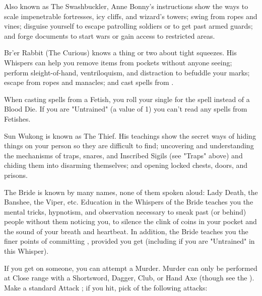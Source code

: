     Also known as The Swashbuckler, Anne Bonny's instructions show the ways to scale impenetrable fortresses, icy cliffs, and wizard's towers; swing from ropes and vines; disguise yourself to escape patrolling soldiers or to get past armed guards; and forge documents to start wars or gain access to restricted areas. 


    Br'er Rabbit (The Curious) knows a thing or two about tight squeezes.  His Whispers can help you remove items from pockets without anyone seeing; perform sleight-of-hand, ventriloquism, and distraction to befuddle your marks; escape from ropes and manacles; and cast spells from . 

    When casting spells from a Fetish, you roll your single \KNAVE for the spell instead of a Blood Die. If you are "Untrained" (a value of 1) you can't read any spells from Fetishes.


    Sun Wukong is known as The Thief.  His teachings show the secret ways of hiding things on your person so they are difficult to find; uncovering and understanding the mechanisms of traps, snares, and Inscribed Sigils (see "Traps" above) and chiding them into disarming themselves; and opening locked chests, doors, and prisons. 



    The Bride is known by many names, none of them spoken aloud:  Lady Death, the Banshee, the Viper, etc.  Education in the Whispers of the Bride teaches you the mental tricks, hypnotism, and observation necessary to sneak past (or behind) people without them noticing you, to silence the clink of coins in your pocket and the sound of your breath and heartbeat. In addition, the Bride teaches you the finer points of committing , provided you get  (including if you are "Untrained" in this Whisper).






    If you get  on someone, you can attempt a Murder.  Murder can only be performed at Close range with a Shortsword, Dagger, Club, or Hand Axe (though see the ).  Make a standard Attack \RO; if you hit, pick  of the following attacks:

